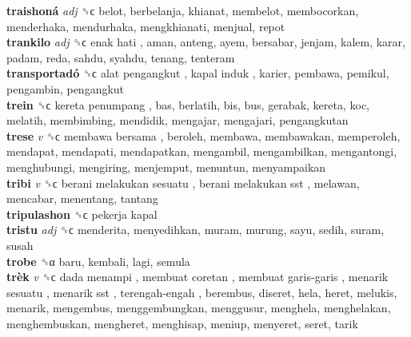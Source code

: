 \textbf{traishoná} \emph{adj}  ␝ϲ  belot, berbelanja, khianat, membelot, membocorkan, menderhaka, mendurhaka, mengkhianati, menjual, repot  \\
\textbf{trankilo} \emph{adj}  ␝ϲ   enak hati , aman, anteng, ayem, bersabar, jenjam, kalem, karar, padam, reda, sahdu, syahdu, tenang, tenteram  \\
\textbf{transportadó} ␝ϲ   alat pengangkut ,  kapal induk , karier, pembawa, pemikul, pengambin, pengangkut  \\
\textbf{trein} ␝ϲ   kereta penumpang , bas, berlatih, bis, bus, gerabak, kereta, koc, melatih, membimbing, mendidik, mengajar, mengajari, pengangkutan  \\
\textbf{trese} \emph{v}  ␝ϲ   membawa bersama , beroleh, membawa, membawakan, memperoleh, mendapat, mendapati, mendapatkan, mengambil, mengambilkan, mengantongi, menghubungi, mengiring, menjemput, menuntun, menyampaikan  \\
\textbf{tribi} \emph{v}  ␝ϲ   berani melakukan sesuatu ,  berani melakukan sst , melawan, mencabar, menentang, tantang  \\
\textbf{tripulashon} ␝ϲ   pekerja kapal   \\
\textbf{tristu} \emph{adj}  ␝ϲ  menderita, menyedihkan, muram, murung, sayu, sedih, suram, susah  \\
\textbf{trobe} ␝α  baru, kembali, lagi, semula  \\
\textbf{trèk} \emph{v}  ␝ϲ   dada menampi ,  membuat coretan ,  membuat garis-garis ,  menarik sesuatu ,  menarik sst ,  terengah-engah , berembus, diseret, hela, heret, melukis, menarik, mengembus, menggembungkan, menggusur, menghela, menghelakan, menghembuskan, mengheret, menghisap, meniup, menyeret, seret, tarik  \\
